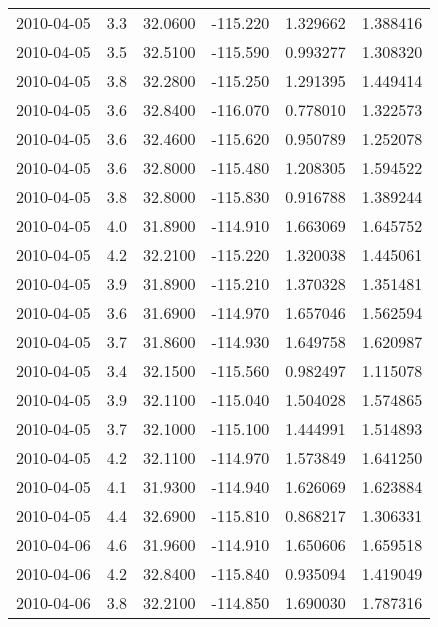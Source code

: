 \begin{tabular}{lrrrrr}
2010-04-05 &       3.3 &  32.0600 &  -115.220 &         1.329662 &         1.388416 \\
2010-04-05 &       3.5 &  32.5100 &  -115.590 &         0.993277 &         1.308320 \\
2010-04-05 &       3.8 &  32.2800 &  -115.250 &         1.291395 &         1.449414 \\
2010-04-05 &       3.6 &  32.8400 &  -116.070 &         0.778010 &         1.322573 \\
2010-04-05 &       3.6 &  32.4600 &  -115.620 &         0.950789 &         1.252078 \\
2010-04-05 &       3.6 &  32.8000 &  -115.480 &         1.208305 &         1.594522 \\
2010-04-05 &       3.8 &  32.8000 &  -115.830 &         0.916788 &         1.389244 \\
2010-04-05 &       4.0 &  31.8900 &  -114.910 &         1.663069 &         1.645752 \\
2010-04-05 &       4.2 &  32.2100 &  -115.220 &         1.320038 &         1.445061 \\
2010-04-05 &       3.9 &  31.8900 &  -115.210 &         1.370328 &         1.351481 \\
2010-04-05 &       3.6 &  31.6900 &  -114.970 &         1.657046 &         1.562594 \\
2010-04-05 &       3.7 &  31.8600 &  -114.930 &         1.649758 &         1.620987 \\
2010-04-05 &       3.4 &  32.1500 &  -115.560 &         0.982497 &         1.115078 \\
2010-04-05 &       3.9 &  32.1100 &  -115.040 &         1.504028 &         1.574865 \\
2010-04-05 &       3.7 &  32.1000 &  -115.100 &         1.444991 &         1.514893 \\
2010-04-05 &       4.2 &  32.1100 &  -114.970 &         1.573849 &         1.641250 \\
2010-04-05 &       4.1 &  31.9300 &  -114.940 &         1.626069 &         1.623884 \\
2010-04-05 &       4.4 &  32.6900 &  -115.810 &         0.868217 &         1.306331 \\
2010-04-06 &       4.6 &  31.9600 &  -114.910 &         1.650606 &         1.659518 \\
2010-04-06 &       4.2 &  32.8400 &  -115.840 &         0.935094 &         1.419049 \\
2010-04-06 &       3.8 &  32.2100 &  -114.850 &         1.690030 &         1.787316 \\

\end{tabular}
